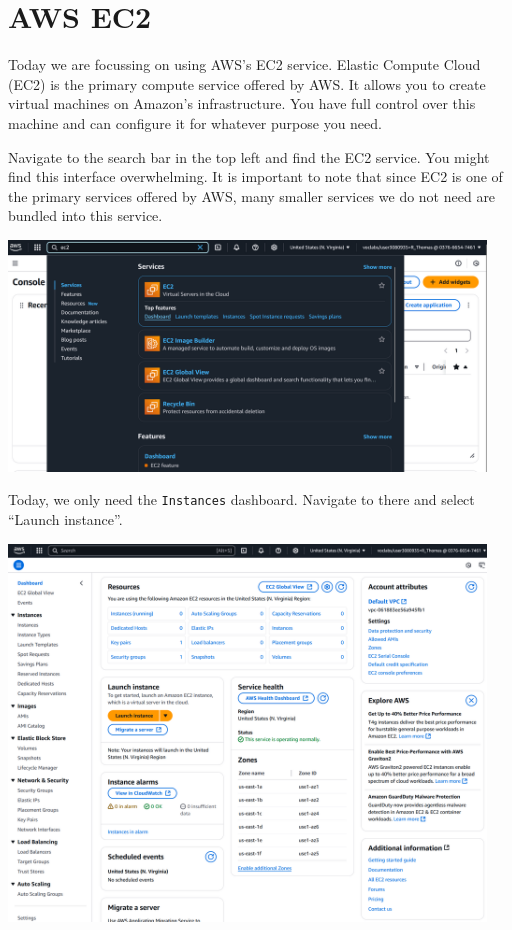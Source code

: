 \documentclass{csse4400}
\begin{document}
\section{AWS EC2}

Today we are focussing on using AWS's EC2 service.
Elastic Compute Cloud (EC2) is the primary compute service offered by AWS.
It allows you to create virtual machines on Amazon's infrastructure.
You have full control over this machine and can configure it for whatever purpose you need.

Navigate to the search bar in the top left and find the EC2 service.
You might find this interface overwhelming.
It is important to note that since EC2 is one of the primary services offered by AWS,
many smaller services we do not need are bundled into this service.


\begin{center}
  \noindent
  \includegraphics[trim=0 20 0 0,clip,width=0.95\textwidth]{images/search-ec2}
\end{center}

\noindent
Today, we only need the \texttt{Instances} dashboard.
Navigate to there and select ``Launch instance''.

\begin{center}
  \noindent
  \includegraphics[trim=0 120 0 0,clip,width=0.95\textwidth]{images/ec2-interface}
\end{center}
\end{document}
